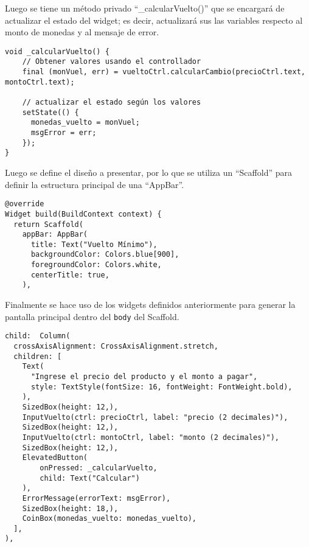 Luego se tiene un método privado “\_calcularVuelto()” que se encargará de actualizar el estado del widget; es decir, actualizará sus las variables respecto al monto de monedas y al mensaje de error.

\begin{center}
\begin{lstlisting}
void _calcularVuelto() {
    // Obtener valores usando el controllador
    final (monVuel, err) = vueltoCtrl.calcularCambio(precioCtrl.text, montoCtrl.text);

    // actualizar el estado según los valores
    setState(() {
      monedas_vuelto = monVuel;
      msgError = err;
    });
}
\end{lstlisting}
\end{center}

Luego se define el diseño a presentar, por lo que se utiliza un “Scaffold” para definir la estructura principal de una “AppBar”.

\begin{center}
\begin{lstlisting}
@override
Widget build(BuildContext context) {
  return Scaffold(
    appBar: AppBar(
      title: Text("Vuelto Mínimo"),
      backgroundColor: Colors.blue[900],
      foregroundColor: Colors.white,
      centerTitle: true,
    ),
\end{lstlisting}
\end{center}

Finalmente se hace uso de los widgets definidos anteriormente para generar la pantalla principal dentro del \lstinline{body} del Scaffold.

\begin{center}
\begin{lstlisting}
child:  Column(
  crossAxisAlignment: CrossAxisAlignment.stretch,
  children: [
    Text(
      "Ingrese el precio del producto y el monto a pagar",
      style: TextStyle(fontSize: 16, fontWeight: FontWeight.bold),
    ),
    SizedBox(height: 12,),
    InputVuelto(ctrl: precioCtrl, label: "precio (2 decimales)"),
    SizedBox(height: 12,),
    InputVuelto(ctrl: montoCtrl, label: "monto (2 decimales)"),
    SizedBox(height: 12,),
    ElevatedButton(
        onPressed: _calcularVuelto,
        child: Text("Calcular")
    ),
    ErrorMessage(errorText: msgError),
    SizedBox(height: 18,),
    CoinBox(monedas_vuelto: monedas_vuelto),
  ],
),
\end{lstlisting}
\end{center}